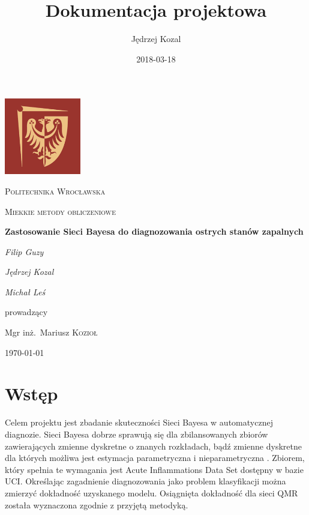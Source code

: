 \documentclass[12pt]{article}
\title{Dokumentacja projektowa}
\date{2018-03-18}
\author{Jędrzej Kozal}
\begin{document}
\begin{titlepage}
	\centering
	\includegraphics[width=0.25\textwidth]{logo_pol_wroclaw.png}\par\vspace{1cm}
	{\scshape\LARGE Politechnika Wrocławska \par}
	\vspace{1cm}
	{\scshape\Large Miekkie metody obliczeniowe\par}
	\vspace{1.5cm}
	{\huge\bfseries Zastosowanie Sieci Bayesa do diagnozowania ostrych stanów zapalnych \par}
	\vspace{2cm}
	{\Large\itshape Filip Guzy\par}
	{\Large\itshape Jędrzej Kozal\par}
	{\Large\itshape Michał Leś\par}

	\vfill
	prowadzący\par
	Mgr inż.~Mariusz \textsc{Kozioł}

	\vfill

	{\large \today\par}
\end{titlepage}

\tableofcontents
\newpage


\section{Wstęp}

Celem projektu jest zbadanie skuteczności Sieci Bayesa w automatycznej diagnozie. Sieci Bayesa dobrze sprawują się dla zbilansowanych zbiorów zawierających zmienne dyskretne o znanych rozkładach, bądź zmienne dyskretne dla których możliwa jest estymacja parametryczna i nieparametryczna \cite{paper}. Zbiorem, który spełnia te wymagania jest Acute Inflammations Data Set dostępny w bazie UCI. Określając zagadnienie diagnozowania jako problem klasyfikacji można zmierzyć dokładność uzyskanego modelu. Osiągnięta dokładność dla sieci QMR została wyznaczona zgodnie z przyjętą metodyką.
\end{document}

